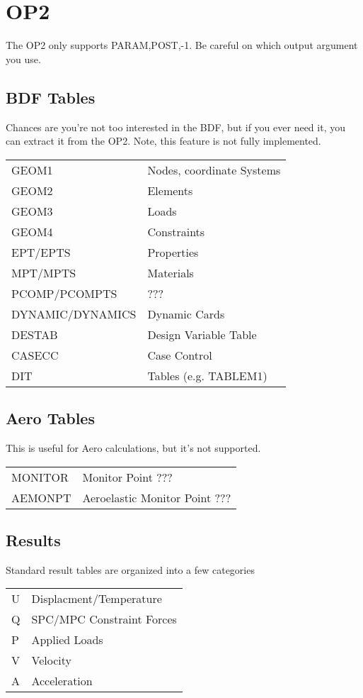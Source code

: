 \section{OP2}
The OP2 only supports PARAM,POST,-1.  Be careful on which output argument you use.

\subsection{BDF Tables}
  Chances are you're not too interested in the BDF, but if you ever need it,
  you can extract it from the OP2.  Note, this feature is not fully implemented.
 \begin{tabular}{ll}
    GEOM1            & Nodes, coordinate Systems         \\
    GEOM2            & Elements                          \\
    GEOM3            & Loads                             \\
    GEOM4            & Constraints                       \\
    EPT/EPTS         & Properties                        \\
    MPT/MPTS         & Materials                         \\
    PCOMP/PCOMPTS    & ???                   \\
    DYNAMIC/DYNAMICS & Dynamic Cards         \\
    DESTAB           & Design Variable Table \\
    CASECC           & Case Control          \\
    DIT              & Tables (e.g. TABLEM1) \\
\end {tabular}

\subsection{Aero Tables}
 This is useful for Aero calculations, but it's not supported.
 \begin{tabular}{ll}
    MONITOR    & Monitor Point ???             \\
    AEMONPT    & Aeroelastic Monitor Point ??? \\
 \end {tabular}

\subsection{Results}
 Standard result tables are organized into a few categories
 \begin{tabular}{ll}
    U   & Displacment/Temperature    \\
    Q   & SPC/MPC Constraint Forces  \\
    P   & Applied Loads              \\
    V   & Velocity                   \\
    A   & Acceleration               \\
 \end {tabular}


